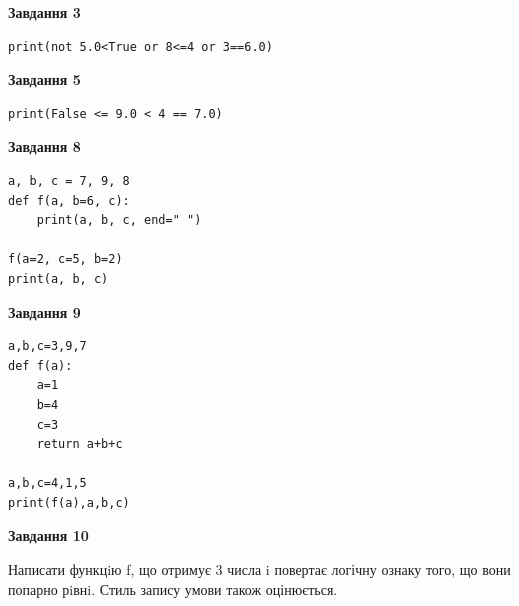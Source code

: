 \documentclass[12pt, ukrainian]{article}
\begin{document}
{\begin {large}
\begin{minipage}[t]{7.5cm}
\end{minipage}
\vline \hspace{6mm}
\begin{minipage}[t]{10.5cm}

\begin{center}
\textbf{Завдання 3}
\end{center}

\begin{verbatim}
print(not 5.0<True or 8<=4 or 3==6.0)
\end{verbatim}



\begin{center}
\textbf{Завдання 5}
\end{center}

\begin{verbatim}
print(False <= 9.0 < 4 == 7.0)
\end{verbatim}



\begin{center}
\textbf{Завдання 8}
\end{center}

\begin{verbatim}
a, b, c = 7, 9, 8
def f(a, b=6, c):
    print(a, b, c, end=" ")

f(a=2, c=5, b=2)
print(a, b, c)
\end{verbatim}



\begin{center}
\textbf{Завдання 9}
\end{center}

\begin{verbatim}
a,b,c=3,9,7
def f(a):
    a=1
    b=4
    c=3
    return a+b+c

a,b,c=4,1,5
print(f(a),a,b,c)
\end{verbatim}



\begin{center}
\textbf{Завдання 10}
\end{center}

Написати функцiю f, що отримує 3 числа i повертає логічну ознаку того, що вони попарно рiвнi. Стиль запису умови також оцінюється.\par

\end{minipage}

\end {large}}
\newpage
\end{document}
